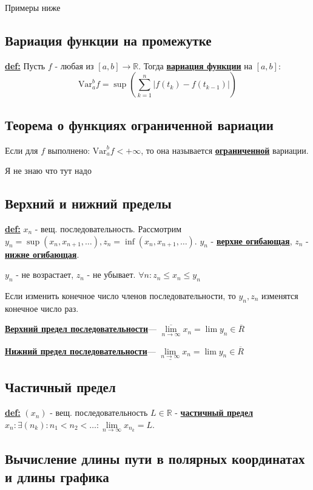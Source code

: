 \documentclass{article}
\newcommand{\Var}{\text{Var}}
\newcommand{\deff}[1]{\underline{\textbf{#1}}}
\begin{document}
Примеры ниже

\subsection{Вариация функции на промежутке}

\deff{def:} Пусть $f$ - любая из $[a,b] \rightarrow \mathbb{R}$. Тогда \deff{вариация функции} на $[a,b]$: $$\Var_a^b f = \sup (\sum\limits_{k=1}^n |f(t_k)-f(t_{k-1})|)$$

\subsection{Теорема о функциях ограниченной вариации}

Если для $f$ выполнено: $\Var_a^b f < + \infty$, то она называется \deff{ограниченной} вариации.

Я не знаю что тут надо

\subsection{Верхний и нижний пределы}


\deff{def:} $x_n$ - вещ. последовательность. Рассмотрим $y_n = \sup (x_n, x_{n+1},\ldots),z_n = \inf(x_n,x_{n+1},\ldots)$. $y_n$ - \deff{верхне огибающая}, $z_n$ - \deff{нижне огибающая}. 

$y_n$ - не возрастает, $z_n$ - не убывает. $\forall n: z_n\leq x_n \leq y_n$

Если изменить конечное число членов последовательности, то $y_n,z_n$ изменятся конечное число раз.

\deff{Верхний предел последовательности}--- $\overline{\lim\limits_{n\rightarrow \infty}}x_n=\lim y_n \in \overline{R}$

\deff{Нижний предел последовательности}--- $\underline{\lim\limits_{n\rightarrow \infty}}x_n=\lim y_n \in \overline{R}$


\subsection{Частичный предел}

\deff{def:} $(x_n)$ - вещ. последовательность $L\in \mathbb{R}$ - \deff{частичный предел} $x_n: \exists (n_k):n_1<n_2<\ldots: \lim\limits_{n\rightarrow \infty} x_{n_k}=L$.

\subsection{Вычисление длины пути в полярных координатах и длины графика}
\end{document}
